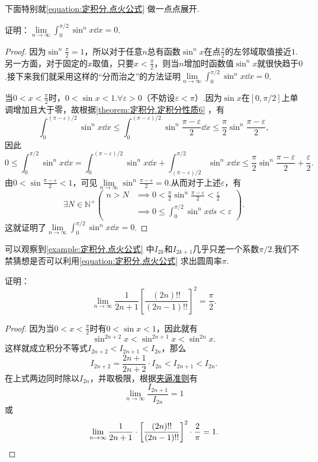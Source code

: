 下面特别就\cref{equation:定积分.点火公式} 做一点点展开.
\begin{example}
证明：\(\lim\limits_{n\to\infty} \int_0^{\pi/2} \sin^n x \dd{x} = 0\).
\begin{proof}
因为\(\sin^n\frac{\pi}{2}=1\)，所以对于任意\(n\)总有函数\(\sin^n x\)在点\(\frac{\pi}{2}\)的左邻域取值接近\(1\).另一方面，对于固定的\(x\)取值，只要\(x<\frac{\pi}{2}\)，则当\(n\)增加时函数值\(\sin^n x\)就很快趋于\(0\).接下来我们就采用这样的“分而治之”的方法证明\(\lim\limits_{n\to\infty} \int_0^{\pi/2} \sin^n x \dd{x} = 0\).

当\(0<x<\frac{\pi}{2}\)时，\(0<\sin x<1\).\(\forall\varepsilon>0\)（不妨设\(\varepsilon<\pi\)）.因为\(\sin x\)在\([0,\pi/2]\)上单调增加且大于零，故根据\cref{theorem:定积分.定积分性质6} ，有\[
\int_0^{(\pi-\varepsilon)/2} \sin^n x \dd{x}
\leqslant
\int_0^{(\pi-\varepsilon)/2} \sin^n\frac{\pi-\varepsilon}{2} \dd{x}
\leqslant
\frac{\pi}{2} \sin^n\frac{\pi-\varepsilon}{2},
\]因此\[
0 \leqslant \int_0^{\pi/2} \sin^n x \dd{x}
= \int_0^{(\pi-\varepsilon)/2} \sin^n x \dd{x}
+ \int_{(\pi-\varepsilon)/2}^{\pi/2} \sin^n x \dd{x}
\leqslant \frac{\pi}{2} \sin^n\frac{\pi-\varepsilon}{2} + \frac{\varepsilon}{2}.
\]由\(0<\sin\frac{\pi-\varepsilon}{2}<1\)，可见\(\lim\limits_{n\to\infty} \sin^n\frac{\pi-\varepsilon}{2} = 0\).从而对于上述\(\varepsilon\)，有\[
\exists N\in\mathbb{N}^+ \left( \begin{array}{ll}
n>N &\implies 0<\frac{\pi}{2} \sin^n\frac{\pi-\varepsilon}{2}<\frac{\varepsilon}{2} \\
&\implies 0 \leqslant \int_0^{\pi/2} \sin^n x \dd{s} < \varepsilon
\end{array} \right).
\]这就证明了\(\lim\limits_{n\to\infty} \int_0^{\pi/2} \sin^n x \dd{x} = 0\).
\end{proof}
\end{example}

可以观察到\cref{example:定积分.点火公式} 中\(I_{2k}\)和\(I_{2k+1}\)几乎只差一个系数\(\pi/2\).我们不禁猜想是否可以利用\cref{equation:定积分.点火公式} 求出圆周率\(\pi\).
\begin{example}[Wallis公式]
证明：\begin{equation}\label{equation:定积分.Wallis公式}
\lim\limits_{n\to\infty} \frac{1}{2n+1} \left[
\frac{(2n)!!}{(2n-1)!!}
\right]^2 = \frac{\pi}{2}.
\end{equation}
\begin{proof}
因为当\(0<x<\frac{\pi}{2}\)时有\(0<\sin x<1\)，因此就有\[
\sin^{2n+2} x < \sin^{2n+1} x < \sin^{2n} x.
\]这样就成立积分不等式\(I_{2n+2} < I_{2n+1} < I_{2n}\)，那么\[
I_{2n+2} = \frac{2n+1}{2n+2} \cdot I_{2n}
< I_{2n+1} < I_{2n}.
\]在上式两边同时除以\(I_{2n}\)，并取极限，根据\hyperref[theorem:极限.夹逼准则]{夹逼准则}有\[
\lim\limits_{n\to\infty} \frac{I_{2n+1}}{I_{2n}} = 1
\]或\[
\lim\limits_{n\to\infty} \frac{1}{2n+1} \cdot \left[
	\frac{(2n)!!}{(2n-1)!!}
\right]^2 \cdot \frac{2}{\pi} = 1.
\qedhere
\]
\end{proof}
\end{example}

